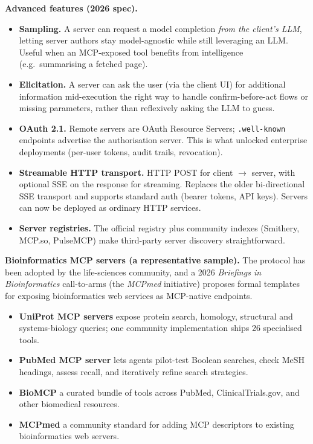 \documentclass[a4paper,11pt]{article}
\begin{document}
\textbf{Advanced features (2026 spec).}

\begin{itemize}[noitemsep, leftmargin=1.2em]
  \item \textbf{Sampling.} A server can request a model completion
        \emph{from the client's LLM}, letting server authors stay
        model-agnostic while still leveraging an LLM. Useful when an
        MCP-exposed tool benefits from intelligence
        (e.g.\ summarising a fetched page).
  \item \textbf{Elicitation.} A server can ask the user (via the
        client UI) for additional information mid-execution
        \textemdash{} the right way to handle confirm-before-act
        flows or missing parameters, rather than reflexively asking
        the LLM to guess.
  \item \textbf{OAuth 2.1.} Remote servers are OAuth Resource
        Servers; \texttt{.well-known} endpoints advertise the
        authorisation server. This is what unlocked enterprise
        deployments (per-user tokens, audit trails, revocation).
  \item \textbf{Streamable HTTP transport.} HTTP POST for client
        $\to$ server, with optional SSE on the response for
        streaming. Replaces the older bi-directional SSE transport
        and supports standard auth (bearer tokens, API keys). Servers
        can now be deployed as ordinary HTTP services.
  \item \textbf{Server registries.} The official registry plus
        community indexes (Smithery, MCP.so, PulseMCP) make
        third-party server discovery straightforward.
\end{itemize}

\textbf{Bioinformatics MCP servers (a representative sample).}
The protocol has been adopted by the life-sciences community, and a
2026 \textit{Briefings in Bioinformatics} call-to-arms (the
\textit{MCPmed} initiative) proposes formal templates for exposing
bioinformatics web services as MCP-native endpoints.

\begin{itemize}[noitemsep, leftmargin=1.2em]
  \item \textbf{UniProt MCP servers} \textemdash{} expose protein
        search, homology, structural and systems-biology queries; one
        community implementation ships 26 specialised tools.
  \item \textbf{PubMed MCP server} \textemdash{} lets agents
        pilot-test Boolean searches, check MeSH headings, assess
        recall, and iteratively refine search strategies.
  \item \textbf{BioMCP} \textemdash{} a curated bundle of tools across
        PubMed, ClinicalTrials.gov, and other biomedical resources.
  \item \textbf{MCPmed} \textemdash{} a community standard for adding
        MCP descriptors to existing bioinformatics web servers.
\end{itemize}
\end{document}
